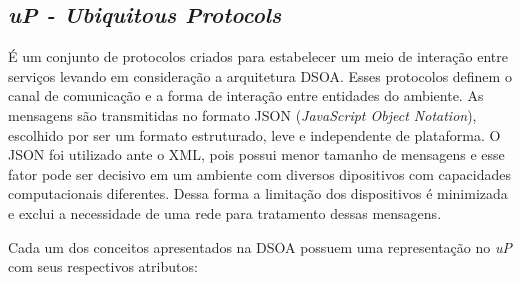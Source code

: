 \subsection{\emph{uP - Ubiquitous Protocols}}

É um conjunto de protocolos criados para estabelecer um meio de interação entre serviços levando em consideração a arquitetura DSOA. Esses protocolos definem o canal de comunicação e a forma de interação entre entidades do ambiente. As mensagens são transmitidas no formato JSON (\emph{JavaScript Object Notation}), escolhido por ser um formato estruturado, leve e independente de plataforma. O JSON foi utilizado ante o XML, pois possui menor tamanho de mensagens e esse fator pode ser decisivo em um ambiente com diversos dipositivos com capacidades computacionais diferentes. Dessa forma a limitação dos dispositivos é minimizada e exclui a necessidade de uma rede para tratamento dessas mensagens.

Cada um dos conceitos apresentados na DSOA possuem uma representação no \emph{uP} com seus respectivos atributos:


